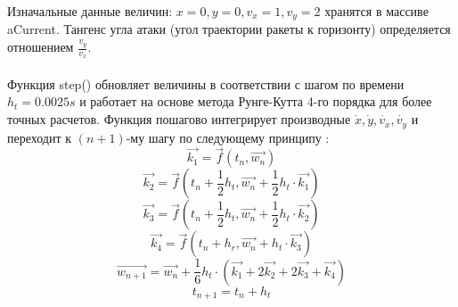 \documentclass {report}
\begin{document}
Изначальные данные величин: $x=0, y=0, v_x=1, v_y=2$ хранятся в массиве aCurrent. Тангенс угла атаки (угол траектории ракеты к горизонту) определяется отношением $\frac{v_y}{v_x}$. 
\\\\
Функция step() обновляет величины в соответствии с шагом по времени $h_t=0.0025 s$ и работает на основе метода Рунге-Кутта 4-го порядка для более точных расчетов. Функция пошагово интегрирует производные $\dot{x}, \dot{y}, \dot{v_x}, \dot{v_y}$ и переходит к $(n+1)$-му шагу по следующему принципу :
$$
\vec{k_1} = \vec{f}(t_n, \vec{w_n})
$$
$$
\vec{k_2} = \vec{f}(t_n+\frac{1}{2}h_t, \vec{w_n}+\frac{1}{2}h_t\cdot \vec{k_1})
$$
$$
\vec{k_3} = \vec{f}(t_n + \frac{1}{2}h_t, \vec{w_n}+\frac{1}{2}h_t\cdot \vec{k_2})
$$
$$
\vec{k_4} = \vec{f}(t_n + h_r, \vec{w_n} + h_t\cdot \vec{k_3})
$$
$$
\vec{w_{n+1}} = \vec{w_n} + \frac{1}{6}h_t\cdot (\vec{k_1} + 2\vec{k_2} + 2\vec{k_3} + \vec{k_4})
$$
$$
t_{n+1} = t_n + h_t
$$
\end{document}
